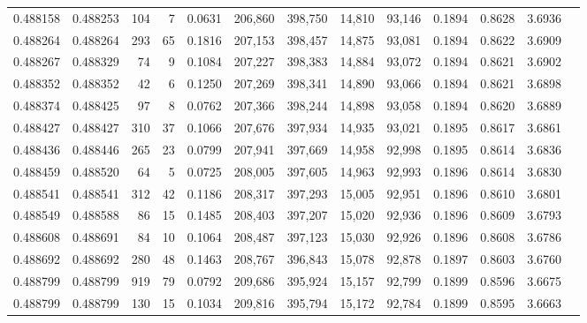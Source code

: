 \begin{tabular}{rrrrrrrrrrrrr}
0.488158 & 0.488253 &   104 &     7 &                                     0.0631 & 206,860 & 398,750 &  14,810 &  93,146 & 0.1894 & 0.8628 & 3.6936 \\
0.488264 & 0.488264 &   293 &    65 &                                     0.1816 & 207,153 & 398,457 &  14,875 &  93,081 & 0.1894 & 0.8622 & 3.6909 \\
0.488267 & 0.488329 &    74 &     9 &                                     0.1084 & 207,227 & 398,383 &  14,884 &  93,072 & 0.1894 & 0.8621 & 3.6902 \\
0.488352 & 0.488352 &    42 &     6 &                                     0.1250 & 207,269 & 398,341 &  14,890 &  93,066 & 0.1894 & 0.8621 & 3.6898 \\
0.488374 & 0.488425 &    97 &     8 &                                     0.0762 & 207,366 & 398,244 &  14,898 &  93,058 & 0.1894 & 0.8620 & 3.6889 \\
0.488427 & 0.488427 &   310 &    37 &                                     0.1066 & 207,676 & 397,934 &  14,935 &  93,021 & 0.1895 & 0.8617 & 3.6861 \\
0.488436 & 0.488446 &   265 &    23 &                                     0.0799 & 207,941 & 397,669 &  14,958 &  92,998 & 0.1895 & 0.8614 & 3.6836 \\
0.488459 & 0.488520 &    64 &     5 &                                     0.0725 & 208,005 & 397,605 &  14,963 &  92,993 & 0.1896 & 0.8614 & 3.6830 \\
0.488541 & 0.488541 &   312 &    42 &                                     0.1186 & 208,317 & 397,293 &  15,005 &  92,951 & 0.1896 & 0.8610 & 3.6801 \\
0.488549 & 0.488588 &    86 &    15 &                                     0.1485 & 208,403 & 397,207 &  15,020 &  92,936 & 0.1896 & 0.8609 & 3.6793 \\
0.488608 & 0.488691 &    84 &    10 &                                     0.1064 & 208,487 & 397,123 &  15,030 &  92,926 & 0.1896 & 0.8608 & 3.6786 \\
0.488692 & 0.488692 &   280 &    48 &                                     0.1463 & 208,767 & 396,843 &  15,078 &  92,878 & 0.1897 & 0.8603 & 3.6760 \\
0.488799 & 0.488799 &   919 &    79 &                                     0.0792 & 209,686 & 395,924 &  15,157 &  92,799 & 0.1899 & 0.8596 & 3.6675 \\
0.488799 & 0.488799 &   130 &    15 &                                     0.1034 & 209,816 & 395,794 &  15,172 &  92,784 & 0.1899 & 0.8595 & 3.6663 \\

\end{tabular}
